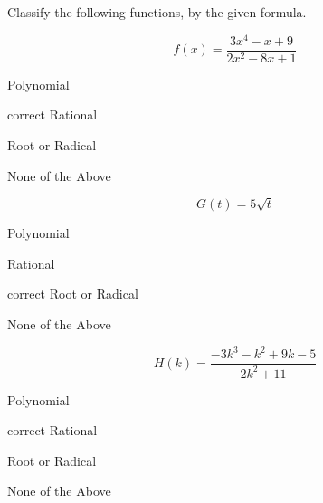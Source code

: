 \documentclass{ximera}
\author{Lee Wayand}
\begin{document}
\begin{exercise}




Classify the following functions, by the given formula.



\begin{question}


\[
f(x) = \frac{3x^4 - x + 9}{2x^2 - 8x + 1}
\]

\begin{multipleChoice}
\item {Polynomial}
\item [correct]{Rational}
\item {Root or Radical}
\item {None of the Above}
\end{multipleChoice}


\end{question}











\begin{question}


\[
G(t) = 5 \sqrt{t}
\]

\begin{multipleChoice}
\item {Polynomial}
\item {Rational}
\item [correct]{Root or Radical}
\item {None of the Above}
\end{multipleChoice}


\end{question}







\begin{question}


\[
H(k) = \frac{-3k^3 - k^2 + 9k - 5}{2k^2 + 11}
\]

\begin{multipleChoice}
\item {Polynomial}
\item [correct]{Rational}
\item {Root or Radical}
\item {None of the Above}
\end{multipleChoice}



\end{question}
\end{exercise}
\end{document}
